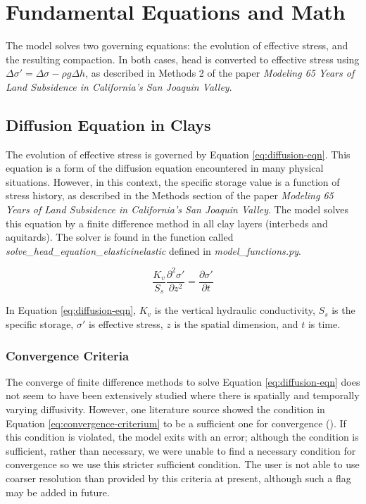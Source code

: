 \documentclass{article}
\begin{document}
\section{Fundamental Equations and Math}

The model solves two governing equations: the evolution of effective stress, and the resulting compaction. In both cases, head is converted to effective stress using $\Delta \sigma' = \Delta \sigma - \rho g \Delta h$, as described in Methods 2 of the paper \textit{Modeling 65 Years of Land Subsidence in California’s San Joaquin Valley}.

\subsection{Diffusion Equation in Clays}
\label{sec:diffusion}

The evolution of effective stress is governed by Equation \ref{eq:diffusion-eqn}. This equation is a form of the diffusion equation encountered in many physical situations. However, in this context, the specific storage value is a function of stress history, as described in the Methods section of the paper \textit{Modeling 65 Years of Land Subsidence in California’s San Joaquin Valley}. The model solves this equation by a finite difference method in all clay layers (interbeds and aquitards). The solver is found in the function called \textit{solve\_head\_equation\_elasticinelastic} defined in \textit{model\_functions.py}.

\begin{equation}
\frac{K_v}{S_s} \frac{\partial^2\sigma'}{\partial z^2} = \frac{\partial \sigma'}{\partial t}
\label{eq:diffusion-eqn}
\end{equation}

In Equation \ref{eq:diffusion-eqn}, $K_v$ is the vertical hydraulic conductivity, $S_s$ is the specific storage, $ \sigma'$ is effective stress, $z$ is the spatial dimension, and $ t$ is time.

\subsubsection{Convergence Criteria}
\label{sec:Convergence_gwflow}

The converge of finite difference methods to solve Equation \ref{eq:diffusion-eqn} does not seem to have been extensively studied where there is spatially and temporally varying diffusivity. However, one literature source showed the condition in Equation \ref{eq:convergence-criterium} to be a sufficient one for convergence (\cite{lee_stability_2017}). If this condition is violated, the model exits with an error; although the condition is sufficient, rather than necessary, we were unable to find a necessary condition for convergence so we use this stricter sufficient condition. The user is not able to use coarser resolution than provided by this criteria at present, although such a flag may be added in future.
\end{document}

